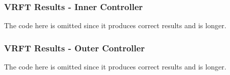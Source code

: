 \documentclass{beamer}
\begin{document}
\begin{frame}[fragile]
	\frametitle{VRFT Results - Inner Controller}
	
	The code here is omitted since it produces correct results and is longer. 
	
	\begin{figure}
		
	\end{figure}
\end{frame}

\begin{frame}[fragile]
	\frametitle{VRFT Results - Outer Controller}
	
	The code here is omitted since it produces correct results and is longer. 
	
	\begin{figure}
		
	\end{figure}
\end{frame}
\end{document}

